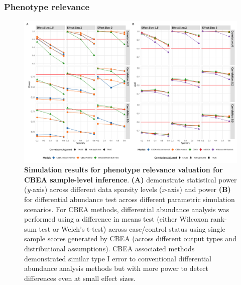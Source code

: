 \documentclass{article}
\begin{document}
\subsubsection{Phenotype relevance} 

\begin{figure}[!h]
    \centering
    \includegraphics[width = \textwidth]{figures/sim_ss_pwr.png}
    \caption{\textbf{Simulation results for phenotype relevance valuation for CBEA sample-level inference}. \textbf{(A)} demonstrate statistical power (\emph{y}-axis) across different data sparsity levels (\emph{x}-axis) and power \textbf{(B)} for differential abundance test across different parametric simulation scenarios. For CBEA methods, differential abundance analysis was performed using a difference in means test (either Wilcoxon rank-sum test or Welch's t-test) across case/control status using single sample scores generated by CBEA (across different output types and distributional assumptions). CBEA associated methods demonstrated similar type I error to conventional differential abundance analysis methods but with more power to detect differences even at small effect sizes.} 
    \label{fig:s3}
\end{figure}
\end{document}
